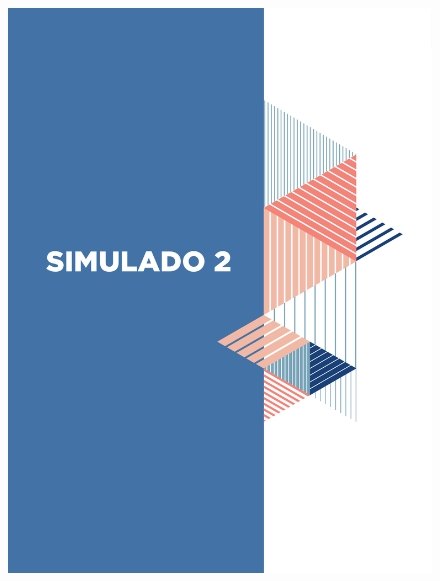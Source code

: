 \begin{figure}[htpb!]
\vspace*{-3cm}
\hspace*{-2.5cm}\includegraphics[scale=1]{../watermarks/2simulado9ano.pdf}
\end{figure}


